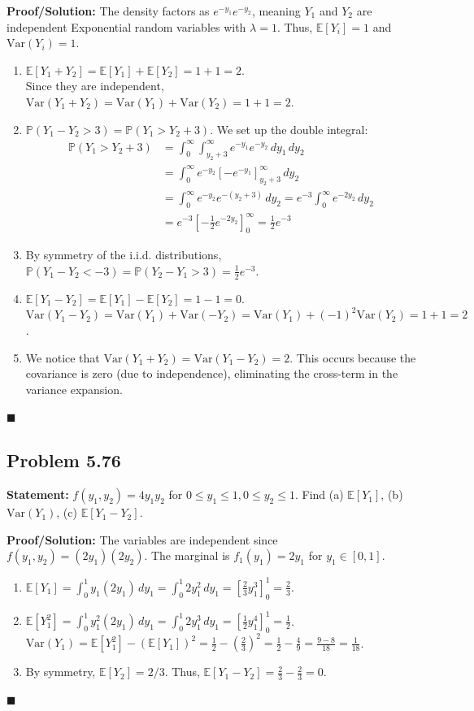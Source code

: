 \documentclass[11pt, a4paper]{article}
\theoremstyle{definition}
\theoremstyle{remark}
\newcommand{\E}{\mathbb{E}}
\newcommand{\Prob}{\mathbb{P}}
\newcommand{\Var}{\mathrm{Var}}
\begin{document}
\textbf{Proof/Solution:}
The density factors as $e^{-y_1} e^{-y_2}$, meaning $Y_1$ and $Y_2$ are independent Exponential random variables with $\lambda = 1$. Thus, $\E[Y_i] = 1$ and $\Var(Y_i) = 1$.
\begin{enumerate}[label=\alph*)]
    \item $\E[Y_1 + Y_2] = \E[Y_1] + \E[Y_2] = 1 + 1 = 2$. \\ \relax
    Since they are independent, $\Var(Y_1 + Y_2) = \Var(Y_1) + \Var(Y_2) = 1 + 1 = 2$.
    \item $\Prob(Y_1 - Y_2 > 3) = \Prob(Y_1 > Y_2 + 3)$. We set up the double integral:
    \begin{align*}
        \Prob(Y_1 > Y_2 + 3) &= \int_0^\infty \int_{y_2+3}^\infty e^{-y_1} e^{-y_2} \, dy_1 \, dy_2 \\
        &= \int_0^\infty e^{-y_2} \left[ -e^{-y_1} \right]_{y_2+3}^\infty \, dy_2 \\
        &= \int_0^\infty e^{-y_2} e^{-(y_2+3)} \, dy_2 = e^{-3} \int_0^\infty e^{-2y_2} \, dy_2 \\
        &= e^{-3} \left[ -\frac{1}{2} e^{-2y_2} \right]_0^\infty = \frac{1}{2} e^{-3}
    \end{align*}
    \item By symmetry of the i.i.d. distributions, $\Prob(Y_1 - Y_2 < -3) = \Prob(Y_2 - Y_1 > 3) = \frac{1}{2} e^{-3}$.
    \item $\E[Y_1 - Y_2] = \E[Y_1] - \E[Y_2] = 1 - 1 = 0$. \\ \relax
    $\Var(Y_1 - Y_2) = \Var(Y_1) + \Var(-Y_2) = \Var(Y_1) + (-1)^2\Var(Y_2) = 1 + 1 = 2$.
    \item We notice that $\Var(Y_1 + Y_2) = \Var(Y_1 - Y_2) = 2$. This occurs because the covariance is zero (due to independence), eliminating the cross-term in the variance expansion.
\end{enumerate}
\hfill $\blacksquare$

\subsection{Problem 5.76}
\textbf{Statement:} $f(y_1, y_2) = 4y_1 y_2$ for $0 \leq y_1 \leq 1, 0 \leq y_2 \leq 1$. Find (a) $\E[Y_1]$, (b) $\Var(Y_1)$, (c) $\E[Y_1 - Y_2]$.

\textbf{Proof/Solution:}
The variables are independent since $f(y_1, y_2) = (2y_1)(2y_2)$. The marginal is $f_1(y_1) = 2y_1$ for $y_1 \in [0,1]$.
\begin{enumerate}[label=\alph*)]
    \item $\E[Y_1] = \int_0^1 y_1 (2y_1) \, dy_1 = \int_0^1 2y_1^2 \, dy_1 = \left[ \frac{2}{3}y_1^3 \right]_0^1 = \frac{2}{3}$.
    \item $\E[Y_1^2] = \int_0^1 y_1^2 (2y_1) \, dy_1 = \int_0^1 2y_1^3 \, dy_1 = \left[ \frac{1}{2}y_1^4 \right]_0^1 = \frac{1}{2}$. \\ \relax
    $\Var(Y_1) = \E[Y_1^2] - (\E[Y_1])^2 = \frac{1}{2} - \left(\frac{2}{3}\right)^2 = \frac{1}{2} - \frac{4}{9} = \frac{9 - 8}{18} = \frac{1}{18}$.
    \item By symmetry, $\E[Y_2] = 2/3$. Thus, $\E[Y_1 - Y_2] = \frac{2}{3} - \frac{2}{3} = 0$.
\end{enumerate}
\hfill $\blacksquare$
\end{document}
